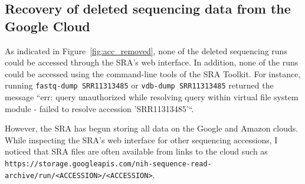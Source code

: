 \documentclass[9pt,twocolumn,twoside]{gsajnl_modified}
\begin{document}
\subsection{Recovery of deleted sequencing data from the Google Cloud} 
As indicated in Figure~\ref{fig:acc_removed}, none of the deleted sequencing runs could be accessed through the SRA's web interface.
In addition, none of the runs could be accessed using the command-line tools of the SRA Toolkit.
For instance, running \texttt{fastq-dump SRR11313485} or \texttt{vdb-dump SRR11313485} returned the message ``err: query unauthorized while resolving query within virtual file system module - failed to resolve accession 'SRR11313485'``.

However, the SRA has begun storing all data on the Google and Amazon clouds.
While inspecting the SRA's web interface for other sequencing accessions, I noticed that SRA files are often available from links to the cloud such as \texttt{https://storage.googleapis.com/nih-sequence-read-archive/run/<ACCESSION>/<ACCESSION>}.
\end{document}

